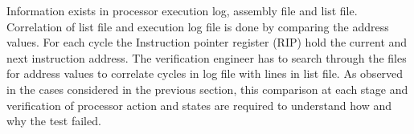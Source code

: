 Information exists in processor execution log, assembly file and list file. Correlation of list file and execution log file is done by comparing the address values. For each cycle the Instruction pointer register (RIP) hold the current and next instruction address. The verification engineer has to search through the files for address values to correlate cycles in log file with lines in list file. As observed in the cases considered in the previous section, this comparison at each stage and verification of processor action and states are required to understand how and why the test failed.

%
%
%
% 
%
%
%


